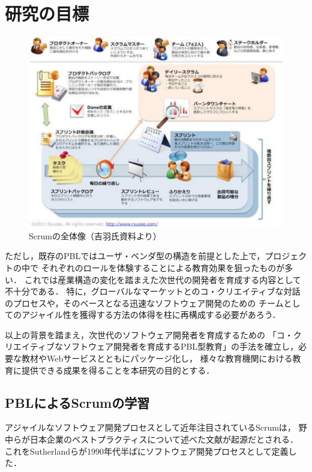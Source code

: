 \documentclass[a4j,9pt,twocolumn,twoside]{jsarticle}
\begin{document}
\section{研究の目標}\label{sec:method}
\begin{figure}
\begin{center}
\includegraphics[width=0.8\linewidth]{figs/scrum.pdf}
\caption{Scrumの全体像（吉羽氏資料より）}
\label{fig:scrum}
\end{center}
\end{figure}

    ただし，既存のPBLではユーザ・ベンダ型の構造を前提とした上で，プロジェクトの中で
    それぞれのロールを体験することによる教育効果を狙ったものが多い．
    これでは産業構造の変化を踏まえた次世代の開発者を育成する内容として不十分である．
    特に，グローバルなマーケットとのコ・クリエイティブな対話のプロセスや，そのベースとなる迅速なソフトウェア開発のための
    チームとしてのアジャイル性を獲得する方法の体得を柱に再構成する必要があろう．
    
    以上の背景を踏まえ，次世代のソフトウェア開発者を育成するための
    「コ・クリエイティブなソフトウェア開発者を育成するPBL型教育」の手法を確立し，必要な教材やWebサービスとともにパッケージ化し，
    様々な教育機関における教育に提供できる成果を得ることを本研究の目的とする．

\subsection{PBLによるScrumの学習}
	アジャイルなソフトウェア開発プロセスとして近年注目されているScrumは，
	野中らが日本企業のベストプラクティスについて述べた文献\cite{nonaka}が起源だとされる．
	これをSutherlandらが1990年代半ばにソフトウェア開発プロセスとして定義した．
	
\end{document}
